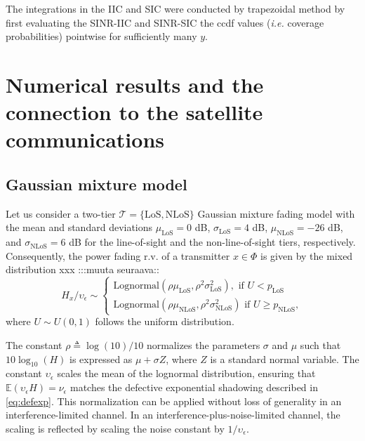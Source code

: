 \documentclass[lettersize,journal]{IEEEtran}
\begin{document}
The integrations in the IIC and SIC were conducted by trapezoidal method by first evaluating the SINR-IIC and SINR-SIC the ccdf values (\textit{i.e.} coverage probabilities) pointwise for sufficiently many $y$.






\section{Numerical results and the connection to the satellite communications}
\label{sec:numericalresultsandconnectiontoLEO}



\subsection{Gaussian mixture model}
Let us consider a two-tier $\mathcal{T} = \{\text{LoS},\text{NLoS}\}$ Gaussian mixture fading model with the mean and standard deviations $\mu_{\text{LoS}}= 0$ dB, $\sigma_{\text{LoS}} = 4$ dB, $\mu_{\text{NLoS}}= -26$ dB, and $\sigma_{\text{NLoS}} = 6$ dB for the line-of-sight and the non-line-of-sight tiers, respectively. Consequently, the power fading r.v. of a transmitter $x \in \Phi$ is given by the mixed distribution xxx :::muuta seuraava::
\begin{equation}
  H_x/\upsilon_{\epsilon} \sim
  \begin{cases}
    \text{Lognormal}(\rho\mu_{\text{LoS}} ,\rho^2 \sigma_{\text{LoS}}^2), \text{ if } U<p_{\text{LoS}} \\
    \text{Lognormal}(\rho \mu_{\text{NLoS}},\rho^2 \sigma_{\text{NLoS}}^2)\text{ if } U \geq p_{\text{NLoS}},              \label{eq:tier2lognormal}
  \end{cases}
\end{equation}
where $U \sim U(0,1)$ follows the uniform distribution.



The constant $\rho \triangleq \log(10)/10$ normalizes the parameters $\sigma$ and $\mu$ such that $10 \log_{10}(H)$ is expressed as $\mu + \sigma Z$, where $Z$ is a standard normal variable. The constant $\upsilon_{\epsilon}$ scales the mean of the lognormal distribution, ensuring that $\mathbb{E}(\upsilon_{\epsilon} H) = \nu_{\epsilon}$ matches the defective exponential shadowing described in \eqref{eq:defexp}. This normalization can be applied without loss of generality in an interference-limited channel. In an interference-plus-noise-limited channel, the scaling is reflected by scaling the noise constant by $1/\upsilon_{\epsilon}$.
\end{document}
